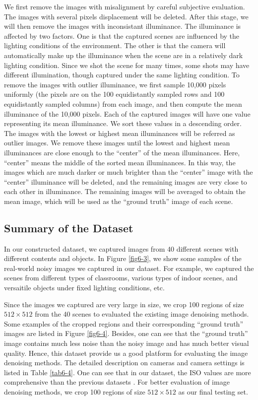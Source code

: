 We first remove the images with misalignment by careful subjective evaluation. The images with several pixels displacement will be deleted. After this stage, we will then remove the images with inconsistant illuminance. The illuminance is affected by two factors. One is that the captured scenes are influenced by the lighting conditions of the environment. The other is that the camera will automatically make up the illuminance when the scene are in a relatively dark lighting condition. Since we shot the scene for many times, some shots may have different illumination, though captured under the same lighting condition. To remove the images with outlier illuminance, we first sample 10,000 pixels uniformly (the pixels are on the 100 equidistantly sampled rows and 100 equidistantly sampled columns) from each image, and then compute the mean illuminance of the 10,000 pixels. Each of the captured images will have one value representing its mean illuminance. We sort these values in a descending order. The images with the lowest or highest mean illuminances will be referred as outlier images. We remove these images until the lowest and highest mean illuminances are close enough to the ``center'' of the mean illuminances. Here, ``center'' means the middle of the sorted mean illuminances. In this way, the images which are much darker or much brighter than the ``center'' image with the ``center'' illuminance will be deleted, and the remaining images are very close to each other in illuminance. The remaining images will be averaged to obtain the mean image, which will be used as the ``ground truth'' image of each scene.



\subsection{Summary of the Dataset}

In our constructed dataset, we captured images from 40 different scenes with different contents and objects. In Figure \ref{fig6-3}, we show some samples of the real-world noisy images we captured in our dataset. For example, we captured the scenes from different types of classrooms, various types of indoor scenes, and versaitile objects under fixed lighting conditions, etc.


Since the images we captured are very large in size, we crop 100 regions of size $512\times512$ from the 40 scenes to evaluated the existing image denoising methods. Some examples of the cropped regions and their corresponding ``ground truth'' images are listed in Figure \ref{fig6-4}. Besides, one can see that the ``ground truth'' image contains much less noise than the noisy image and has much better visual quality. Hence, this dataset provide us a good platform for evaluating the image denoising methods. The detailed description on cameras and camera settings is listed in Table \ref{tab6-4}. One can see that in our dataset, the ISO values are more comprehensive than the previous datasets \cite{RENOIR2014,crosschannel2016,dnd2017}. For better evaluation of image denoising methods, we crop 100 regions of size $512\times512$ as our final testing set.

